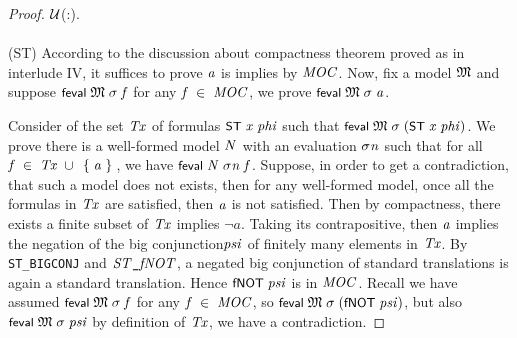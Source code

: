 \documentclass[letterpaper]{article}
\renewcommand{\HOLConst}[1]{{\textsf{\upshape\small #1}}}
\renewcommand{\HOLinline}[1]{\ensuremath{#1}}
\begin{document}
\begin{proof}
{\;\;\;\;\;\;\;\;\;\HOLConst{IMAGE}\;\HOLBoundVar{\ensuremath{\sigma}}\;\ensuremath{\cal{U}}(:)\;\HOLSymConst{\HOLTokenSubset{}}\;.\;\HOLSymConst{\HOLTokenImp{}}\\
\;\;\;\;\;\;\;\;\;\HOLConst{feval}\;\;\HOLBoundVar{\ensuremath{\sigma}}\;\;\HOLSymConst{\HOLTokenImp{}}\\
\;\;\;\;\;\;\;\;\;\HOLConst{feval}\;\;\HOLBoundVar{\ensuremath{\sigma}}\;(\HOLConst{ST}\;\;)\HOLTokenRightbrace{}}
According to the discussion about compactness theorem proved as in interlude IV, it suffices to prove \HOLinline{\HOLFreeVar{a}} is implies by \HOLinline{\HOLFreeVar{MOC}}. Now, fix a model \HOLinline{\HOLFreeVar{\ensuremath{\mathfrak{M}}}} and suppose \HOLinline{\HOLConst{feval}\;\HOLFreeVar{\ensuremath{\mathfrak{M}}}\;\HOLFreeVar{\ensuremath{\sigma}}\;\HOLFreeVar{f}} for any \HOLinline{\HOLFreeVar{f}\;\HOLSymConst{\HOLTokenIn{}}\;\HOLFreeVar{MOC}}, we prove \HOLinline{\HOLConst{feval}\;\HOLFreeVar{\ensuremath{\mathfrak{M}}}\;\HOLFreeVar{\ensuremath{\sigma}}\;\HOLFreeVar{a}}. 

Consider of the set \HOLinline{\HOLFreeVar{Tx}} of formulas \HOLinline{\HOLConst{ST}\;\HOLFreeVar{x}\;\HOLFreeVar{phi}} such that \HOLinline{\HOLConst{feval}\;\HOLFreeVar{\ensuremath{\mathfrak{M}}}\;\HOLFreeVar{\ensuremath{\sigma}}\;(\HOLConst{ST}\;\HOLFreeVar{x}\;\HOLFreeVar{phi})}. We prove there is a well-formed model \HOLinline{\HOLFreeVar{N}} with an evaluation \HOLinline{\HOLFreeVar{\ensuremath{\sigma}n}} such that for all \HOLinline{\HOLFreeVar{f}\;\HOLSymConst{\HOLTokenIn{}}\;\HOLFreeVar{Tx}\;\HOLSymConst{\HOLTokenUnion{}}\;\HOLTokenLeftbrace{}\HOLFreeVar{a}\HOLTokenRightbrace{}}, we have \HOLinline{\HOLConst{feval}\;\HOLFreeVar{N}\;\HOLFreeVar{\ensuremath{\sigma}n}\;\HOLFreeVar{f}}. 
Suppose, in order to get a contradiction, that such a model does not exists, then for any well-formed model, once all the formulas in \HOLinline{\HOLFreeVar{Tx}} are satisfied, then \HOLinline{\HOLFreeVar{a}} is not satisfied. Then by compactness, there exists a finite subset of \HOLinline{\HOLFreeVar{Tx}} implies $\lnot a$. Taking its contrapositive, then \HOLinline{\HOLFreeVar{a}} implies the negation of the big conjunction\HOLinline{\HOLFreeVar{psi}} of finitely many elements in \HOLinline{\HOLFreeVar{Tx}}. By \texttt{ST_BIGCONJ} and \HOLinline{\HOLFreeVar{ST\HOLTokenUnderscore{}fNOT}}, a negated big conjunction of standard translations is again a standard translation. Hence \HOLinline{\HOLConst{fNOT}\;\HOLFreeVar{psi}} is in \HOLinline{\HOLFreeVar{MOC}}. Recall we have assumed \HOLinline{\HOLConst{feval}\;\HOLFreeVar{\ensuremath{\mathfrak{M}}}\;\HOLFreeVar{\ensuremath{\sigma}}\;\HOLFreeVar{f}} for any \HOLinline{\HOLFreeVar{f}\;\HOLSymConst{\HOLTokenIn{}}\;\HOLFreeVar{MOC}}, so \HOLinline{\HOLConst{feval}\;\HOLFreeVar{\ensuremath{\mathfrak{M}}}\;\HOLFreeVar{\ensuremath{\sigma}}\;(\HOLConst{fNOT}\;\HOLFreeVar{psi})}, but also \HOLinline{\HOLConst{feval}\;\HOLFreeVar{\ensuremath{\mathfrak{M}}}\;\HOLFreeVar{\ensuremath{\sigma}}\;\HOLFreeVar{psi}} by definition of \HOLinline{\HOLFreeVar{Tx}}, we have a contradiction. 


\end{proof}
\end{document}
